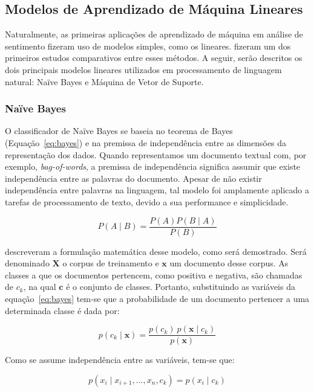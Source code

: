 \subsection{Modelos de Aprendizado de Máquina Lineares}

Naturalmente, as primeiras aplicações de aprendizado de máquina em análise de
sentimento fizeram uso de modelos simples, como os lineares.
\citet{pang02} fizeram um dos primeiros estudos comparativos entre esses
métodos.
A seguir, serão descritos os dois principais modelos lineares utilizados em
processamento de linguagem natural: Naïve Bayes e Máquina de Vetor de Suporte.

\subsubsection{Naïve Bayes}

O classificador de Naïve Bayes se baseia no teorema de Bayes
(Equação~\ref{eq:bayes}) e na premissa de independência entre as dimensões da
representação dos dados.
Quando representamos um documento textual com, por exemplo, \textit{bag-of-words},
a premissa de independência significa assumir que existe independência entre as
palavras do documento.
Apesar de não existir independência entre palavras na linguagem, tal modelo foi
amplamente aplicado a tarefas de processamento de texto, devido a sua performance
e simplicidade.

\begin{equation} \label{eq:bayes}
    P(A\mid B) = \frac{P(A) P(B \mid A)}{P(B)}
\end{equation}

\citet{schutze08} descreveram a formulação matemática desse modelo, como será
demostrado.
Será denominado $\mathbf{X}$ o corpus de treinamento e $\mathbf{x}$ um documento
desse corpus.
As classes a que os documentos pertencem, como positiva e negativa, são chamadas de
$c_k$, na qual $\mathbf{c}$ é o conjunto de classes.
Portanto, substituindo as variáveis da equação~\ref{eq:bayes} tem-se que a
probabilidade de um documento pertencer a uma determinada classe é dada por:

\begin{equation}
    p(c_k \mid \mathbf{x}) = \frac{p(c_k) \ p(\mathbf{x} \mid c_k)}{p(\mathbf{x})}
\end{equation}

Como se assume independência entre as variáveis, tem-se que:

\begin{equation}
    p(x_i \mid x_{i+1}, \dots ,x_{n}, c_k ) = p(x_i \mid c_k)
\end{equation}

